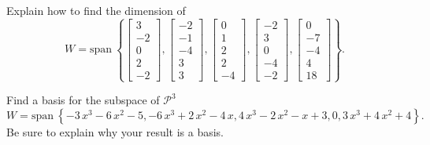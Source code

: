 \documentclass{article}
\begin{document}
\begin{exerciseStatement}
    Explain how to find the dimension of
\[W=\mathrm{span}\ \left\{\left[\begin{array}{r}
3 \\
-2 \\
0 \\
2 \\
-2
\end{array}\right] , \left[\begin{array}{r}
-2 \\
-1 \\
-4 \\
3 \\
3
\end{array}\right] , \left[\begin{array}{r}
0 \\
1 \\
2 \\
2 \\
-4
\end{array}\right] , \left[\begin{array}{r}
-2 \\
3 \\
0 \\
-4 \\
-2
\end{array}\right] , \left[\begin{array}{r}
0 \\
-7 \\
-4 \\
4 \\
18
\end{array}\right]\right\}.\]



  
\end{exerciseStatement}


\begin{exerciseStatement}
    Find a basis for the subspace of \(\mathcal{P}^3\)
\[W=\mathrm{span}\ \left\{-3 \, x^{3} - 6 \, x^{2} - 5 , -6 \, x^{3} + 2 \, x^{2} - 4 \, x , 4 \, x^{3} - 2 \, x^{2} - x + 3 , 0 , 3 \, x^{3} + 4 \, x^{2} + 4\right\}.\]
 Be sure to explain why your result is a basis.


  
\end{exerciseStatement}
\end{document}
